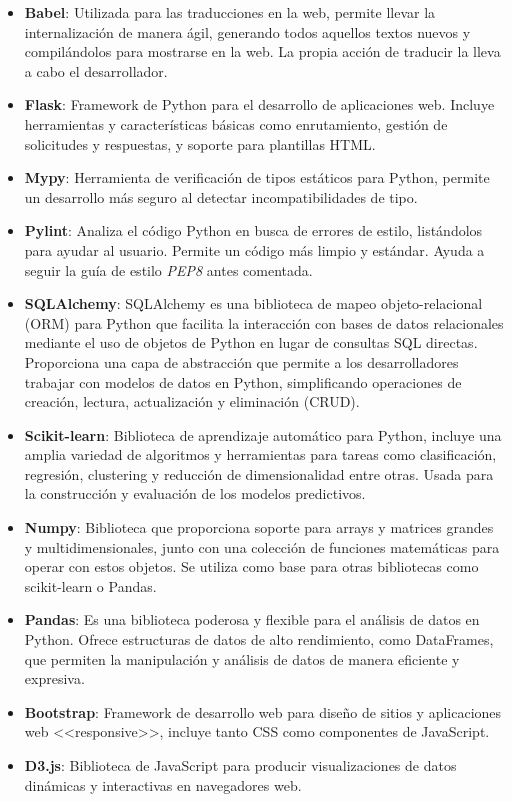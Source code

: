 \begin{itemize}
	\item \textbf{Babel}: Utilizada para las traducciones en la web, permite llevar la internalización de manera ágil, generando todos aquellos textos nuevos y compilándolos para mostrarse en la web. La propia acción de traducir la lleva a cabo el desarrollador.
	\item \textbf{Flask}: Framework de Python para el desarrollo de aplicaciones web. Incluye herramientas y características básicas como enrutamiento, gestión de solicitudes y respuestas, y soporte para plantillas HTML.
	\item \textbf{Mypy}: Herramienta de verificación de tipos estáticos para Python, permite un desarrollo más seguro al detectar incompatibilidades de tipo.
	\item \textbf{Pylint}: Analiza el código Python en busca de errores de estilo, listándolos para ayudar al usuario. Permite un código más limpio y estándar. Ayuda a seguir la guía de estilo \textit{PEP8} antes comentada.
	\item \textbf{SQLAlchemy}: SQLAlchemy es una biblioteca de mapeo objeto-relacional (ORM) para Python que facilita la interacción con bases de datos relacionales mediante el uso de objetos de Python en lugar de consultas SQL directas. Proporciona una capa de abstracción que permite a los desarrolladores trabajar con modelos de datos en Python, simplificando operaciones de creación, lectura, actualización y eliminación (CRUD).
	\item \textbf{Scikit-learn}: Biblioteca de aprendizaje automático para Python, incluye una amplia variedad de algoritmos y herramientas para tareas como clasificación, regresión, clustering y reducción de dimensionalidad entre otras. Usada para la construcción y evaluación de los modelos predictivos.
	\item \textbf{Numpy}: Biblioteca que proporciona soporte para arrays y matrices grandes y multidimensionales, junto con una colección de funciones matemáticas para operar con estos objetos. Se utiliza como base para otras bibliotecas como scikit-learn o Pandas.
	\item \textbf{Pandas}: Es una biblioteca poderosa y flexible para el análisis de datos en Python. Ofrece estructuras de datos de alto rendimiento, como DataFrames, que permiten la manipulación y análisis de datos de manera eficiente y expresiva.
	\item \textbf{Bootstrap}: Framework de desarrollo web para diseño de sitios y aplicaciones web <<responsive>>, incluye tanto CSS como componentes de JavaScript.
	\item \textbf{D3.js}: Biblioteca de JavaScript para producir visualizaciones de datos dinámicas y interactivas en navegadores web.
\end{itemize}
